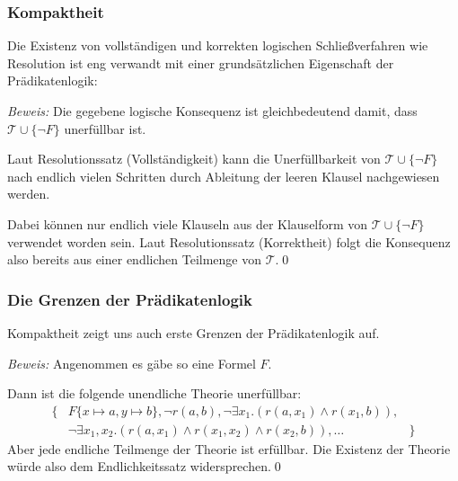 \documentclass[onlymath]{beamer}
\begin{document}
\begin{frame}\frametitle{Kompaktheit}

Die Existenz von vollständigen und korrekten logischen Schließverfahren wie Resolution
ist eng verwandt mit einer grundsätzlichen Eigenschaft der Prädikatenlogik:\bigskip

\pause

\small
\emph{Beweis:} Die gegebene logische Konsequenz ist gleichbedeutend damit, dass
$\mathcal{T}\cup\{\neg F\}$ unerfüllbar ist.\medskip

Laut Resolutionssatz (Vollständigkeit) kann die Unerfüllbarkeit von $\mathcal{T}\cup\{\neg F\}$ nach endlich vielen Schritten durch Ableitung der leeren Klausel nachgewiesen werden.\medskip

Dabei können nur endlich viele Klauseln aus der Klauselform von $\mathcal{T}\cup\{\neg F\}$ verwendet worden sein. Laut Resolutionssatz (Korrektheit) folgt die Konsequenz also bereits aus einer endlichen Teilmenge von $\mathcal{T}$.\qed

\end{frame}

\begin{frame}\frametitle{Die Grenzen der Prädikatenlogik}

Kompaktheit zeigt uns auch erste Grenzen der Prädikatenlogik auf.
\smallskip

\pause

\pause

\emph{Beweis:} Angenommen es gäbe so eine Formel $F$.\medskip

Dann ist die folgende unendliche Theorie unerfüllbar:
\[\begin{array}{rll}
\big\{ & F\{x\mapsto a,y\mapsto b\},\neg r(a,b), \neg \exists x_1.(r(a,x_1)\wedge r(x_1,b)),\\
& \neg\exists x_1,x_2.(r(a,x_1)\wedge
r(x_1,x_2)\wedge r(x_2,b)),\ldots & \big\}
\end{array}\]
Aber jede endliche Teilmenge der Theorie ist erfüllbar.
Die Existenz der Theorie würde also dem Endlichkeitssatz widersprechen.\qed

\end{frame}
\end{document}
